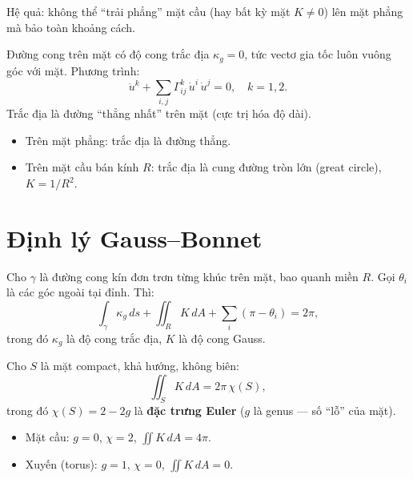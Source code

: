 \documentclass[12pt,a4paper]{article}
\begin{document}
\begin{luuy}
  Hệ quả: không thể ``trải phẳng'' mặt cầu (hay bất kỳ mặt $K \ne 0$) lên mặt phẳng mà bảo toàn khoảng cách.
\end{luuy}

\begin{dinhnghia}[title={Đường trắc địa (geodesic)}]
  Đường cong trên mặt có độ cong trắc địa $\kappa_g = 0$, tức vectơ gia tốc luôn vuông góc với mặt. Phương trình:
  \[
    \ddot{u}^k + \sum_{i,j} \Gamma^k_{ij}\,\dot{u}^i\,\dot{u}^j = 0, \quad k = 1, 2.
  \]
  Trắc địa là đường ``thẳng nhất'' trên mặt (cực trị hóa độ dài).
\end{dinhnghia}

\begin{vidu}
  \begin{itemize}
    \item Trên mặt phẳng: trắc địa là đường thẳng.
    \item Trên mặt cầu bán kính $R$: trắc địa là cung đường tròn lớn (great circle), $K = 1/R^2$.
  \end{itemize}
\end{vidu}

\section{Định lý Gauss--Bonnet}

\begin{dinhly}[title={Gauss--Bonnet cục bộ}]
  Cho $\gamma$ là đường cong kín đơn trơn từng khúc trên mặt, bao quanh miền $R$. Gọi $\theta_i$ là các góc ngoài tại đỉnh. Thì:
  \[
    \int_\gamma \kappa_g\,ds + \iint_R K\,dA + \sum_i (\pi - \theta_i) = 2\pi,
  \]
  trong đó $\kappa_g$ là độ cong trắc địa, $K$ là độ cong Gauss.
\end{dinhly}

\begin{dinhly}[title={Gauss--Bonnet toàn cục}]
  Cho $S$ là mặt compact, khả hướng, không biên:
  \[
    \iint_S K\,dA = 2\pi\,\chi(S),
  \]
  trong đó $\chi(S) = 2 - 2g$ là \textbf{đặc trưng Euler} ($g$ là genus --- số ``lỗ'' của mặt).
\end{dinhly}

\begin{vidu}
  \begin{itemize}
    \item Mặt cầu: $g = 0$, $\chi = 2$, $\iint K\,dA = 4\pi$.
    \item Xuyến (torus): $g = 1$, $\chi = 0$, $\iint K\,dA = 0$.
  \end{itemize}
\end{vidu}
\end{document}
